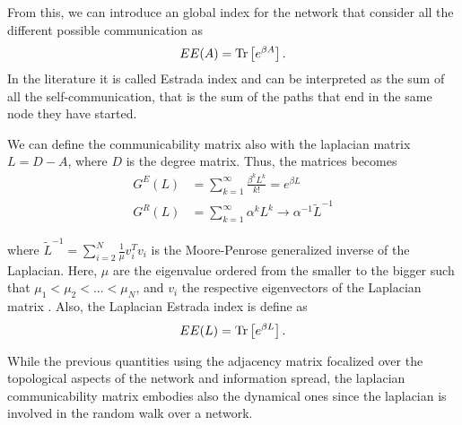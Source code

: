 From this, we can introduce an global index for the network that consider all the different possible communication as
\begin{equation}
    EE(A)  = \operatorname{Tr}\left[e^{\beta A}\right].
\end{equation}
In the literature it is called Estrada index \cite{Estrada_2008} and can be interpreted as the sum of all the self-communication, that is the sum of the paths that end in the same node they have started.

We can define the communicability matrix also with the laplacian matrix $L = D - A$, where $D$ is the degree matrix. 
Thus, the matrices becomes \cite{Estrada_2012}
\begin{equation}\label{Estrada indeces}
    \begin{split}
        G^E(L) &=\sum_{k=1}^{\infty} \frac{\beta^k L^k}{k!} = e^{\beta L}  \\ 
        G^R(L) &= \sum_{k=1}^{\infty} \alpha^k L^k \rightarrow \alpha^{-1} \tilde{L}^{-1}
    \end{split}
\end{equation}

where $\tilde{L}^{-1} = \sum_{i=2}^N \frac{1}{\mu}v_i^Tv_i$ is the Moore-Penrose generalized inverse of the Laplacian. Here, $\mu$ are the eigenvalue ordered from the smaller to the bigger such that $\mu_1 < \mu_2 < ... < \mu_N$, and $v_i$ the respective eigenvectors of the Laplacian matrix \cite{Generalized_inverse_Laplacian}.
Also, the Laplacian Estrada index is define as
\begin{equation}\label{EE_L}
    EE(L) = \operatorname{Tr}\left[e^{\beta L}\right].
\end{equation}

While the previous quantities using the adjacency matrix focalized over the topological aspects of the network and information spread, the laplacian communicability matrix embodies also the dynamical ones since the laplacian is involved in the random walk over a network. 


